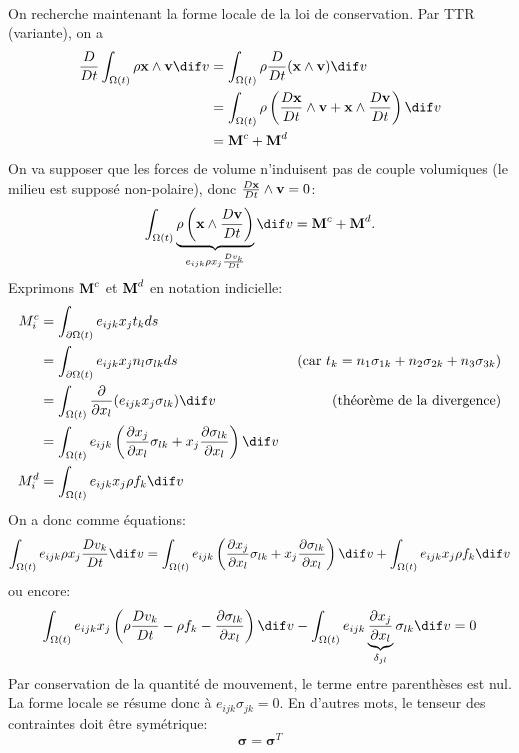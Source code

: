 \paragraph{}
On recherche maintenant la forme locale de la loi de conservation. Par TTR (variante), on a
$$\begin{aligned}
\frac{D}{Dt}\int_{\Omega (t)}\rho\fv{x}\wedge\fv{v} \dif v &=\int_{\Omega (t)}\rho\frac{D}{Dt}(\fv{x}\wedge\fv{v}) \dif v\\
 &=\int_{\Omega (t)}\rho \left(\frac{D\fv{x}}{Dt}\wedge\fv{v}+\fv{x}\wedge\frac{D\fv{v}}{Dt}\right) \dif v\\
  & =\fv{M}^c+\fv{M}^d\\
\end{aligned}$$
On va supposer que les forces de volume  n'induisent pas de couple volumiques (le milieu est supposé non-polaire), donc $\frac{D\textbf{x}}{Dt}\wedge\textbf{v}=0$:
$$\int_{\Omega (t)}\underbrace{\rho \left(\fv{x}\wedge\frac{D\fv{v}}{Dt}\right)}_{e_{ijk}\rho x_j\frac{Dv_k}{Dt}} \dif v=\fv{M}^c+\fv{M}^d.$$
Exprimons $\textbf{M}^c$ et $\textbf{M}^d$ en notation indicielle:
$$\begin{aligned}
M_i^c&=\int_{\partial\Omega (t)}e_{ijk}x_jt_kds\\
 & =\int_{\partial\Omega (t)}e_{ijk}x_jn_l\sigma_{lk}ds & \text{  (car } t_k=n_1\sigma_{1k}+n_2\sigma_{2k}+n_3\sigma_{3k}\text{)}\\
 &=\int_{\Omega (t)}\frac{\partial}{\partial x_l}(e_{ijk}x_j\sigma_{lk}) \dif v& \text{(théorème de la divergence)}\\
 &=\int_{\Omega (t)}e_{ijk}\left(\frac{\partial x_j}{\partial x_l}\sigma_{lk}+x_j\frac{\partial\sigma_{lk}}{\partial x_l}\right) \dif v\\
 M_i^d&=\int_{\Omega (t)}e_{ijk}x_j\rho f_k \dif v
\end{aligned}$$
On a donc comme équations:
$$\int_{\Omega (t)}e_{ijk}\rho x_j\frac{Dv_k}{Dt} \dif v=\int_{\Omega (t)}e_{ijk}\left(\frac{\partial x_j}{\partial x_l}\sigma_{lk}+x_j\frac{\partial\sigma_{lk}}{\partial x_l}\right) \dif v+\int_{\Omega (t)}e_{ijk}x_j\rho f_k \dif v$$
ou encore:
$$\int_{\Omega (t)}e_{ijk}x_j\left(\rho\frac{Dv_k}{Dt}-\rho f_k-\frac{\partial \sigma_{lk}}{\partial x_l}\right) \dif v - \int_{\Omega (t)}e_{ijk}\underbrace{\frac{\partial x_j}{\partial x_l}}_{\delta_{jl}}\sigma_{lk} \dif v=0$$
Par conservation de la quantité de mouvement, le terme entre parenthèses est nul. La forme locale se résume donc à $e_{ijk}\sigma_{jk}=0$. En d'autres mots, le tenseur des contraintes doit être symétrique:
$$\boxed{\boldsymbol{\sigma}=\boldsymbol{\sigma}^T}$$

